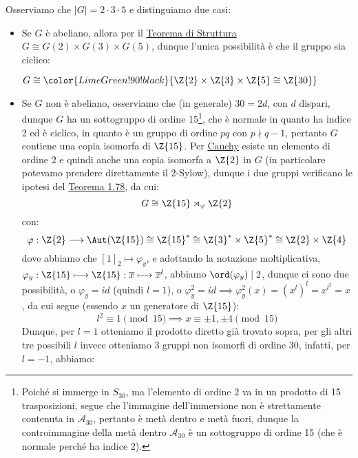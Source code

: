 \documentclass[11pt]{scrartcl}
\begin{document}
\begin{example}
    Osserviamo che $|G| = 2 \cdot 3 \cdot 5$ e distinguiamo due casi:
    \begin{itemize}
        \item Se $G$ è abeliano, allora per il \hyperref[t:struttura]{Teorema di Struttura} $G \cong G(2) \times G(3) \times G(5)$, dunque l'unica possibilità è che il gruppo sia ciclico:
            \begin{center}
                $G \cong \color{LimeGreen!90!black}{\Z{2} \times \Z{3} \times \Z{5} \cong \Z{30}}$
            \end{center}
        \item Se $G$ non è abeliano, osserviamo che (in generale) $30 = 2d$, con $d$ dispari, dunque $G$ ha un sottogruppo di ordine 15\footnote{Poiché si immerge in $S_{30}$, ma l'elemento di ordine 2 va in un prodotto di 15 trasposizioni,
            segue che l'immagine dell'immersione non è strettamente contenuta in $\mathcal{A}_{30}$, pertanto è metà dentro e metà fuori, dunque la controimmagine della metà dentro $\mathcal{A}_{30}$ è un sottogruppo di ordine 15 (che è normale perché ha indice 2).},
            che è normale in quanto ha indice 2 ed è ciclico, in quanto è un gruppo di ordine $pq$
            con $p \nmid q-1$, pertanto $G$ contiene una copia isomorfa di $\Z{15}$. Per \hyperref[p:Cauchy]{Cauchy} esiste un elemento di ordine $2$ e quindi anche una copia isomorfa a $\Z{2}$ in $G$ (in particolare potevamo prendere
            direttamente il $2$-Sylow), dunque i due gruppi verificano le ipotesi del \hyperref[t:1.78]{Teorema 1.78}, da cui:
                \[ G \cong \Z{15} \rtimes_{\varphi} \Z{2}
                    \]
            con:
                \[ \varphi : \Z{2} \longrightarrow \Aut(\Z{15}) \cong \Z{15}^* \cong \Z{3}^* \times \Z{5}^* \cong \Z{2} \times \Z{4}
                    \]
            dove abbiamo che $[1]_2 \longmapsto \varphi_y$, e adottando la notazione moltiplicativa, $\varphi_y : \Z{15} \longmapsto \Z{15} : \overline{x} \longmapsto \overline{x}^l$, abbiamo 
            $\ord(\varphi_y) \mid 2$, dunque ci sono due possibilità, o $\varphi_y = id$ (quindi $l = 1$), o $\varphi_y^2 = id \implies \varphi_y^2(x) = (x^l)^l = x^{l^2} = x$, da cui segue (essendo $x$ un generatore di $\Z{15}$):
                \[ l^2 \equiv 1 \pmod{15} \implies x\equiv \pm 1, \pm 4 \pmod{15}
                    \]
            Dunque, per $l = 1$ otteniamo il prodotto diretto già trovato sopra, per gli altri tre possibili $l$ invece otteniamo 3 gruppi non isomorfi di ordine $30$, infatti, per $l = -1$, abbiamo:

\end{itemize}
\end{example}
\end{document}
